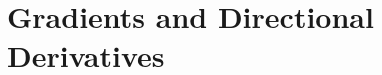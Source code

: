 \documentclass[a4paper, 11pt]{article}
\begin{document}
\maketitle
\thispagestyle{firstpage}

\setcounter{section}{4}
\setcounter{question}{41}

\section{Gradients and Directional Derivatives}

\end{document}
